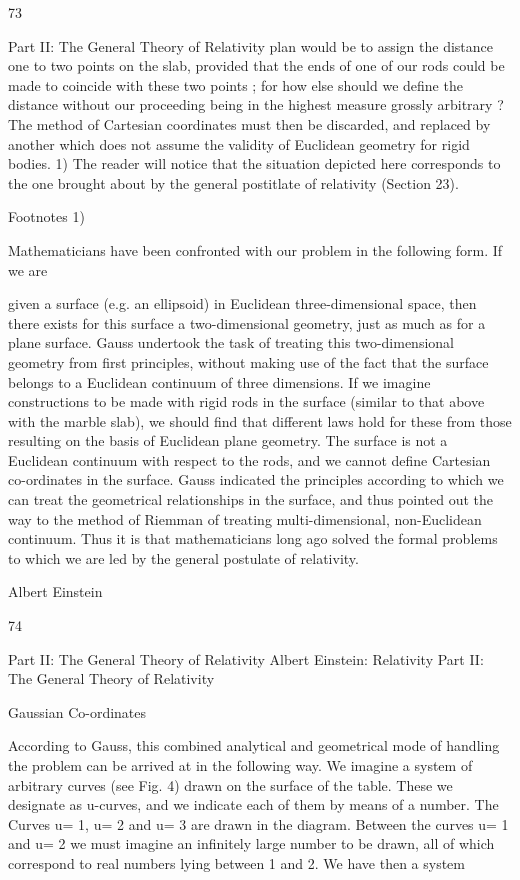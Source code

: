 \documentclass{article}
\begin{document}
73

Part II: The General Theory of Relativity
plan would be to assign the distance one to two points on the slab, provided that the ends of
one of our rods could be made to coincide with these two points ; for how else should we
define the distance without our proceeding being in the highest measure grossly arbitrary ?
The method of Cartesian coordinates must then be discarded, and replaced by another
which does not assume the validity of Euclidean geometry for rigid bodies. 1) The reader
will notice that the situation depicted here corresponds to the one brought about by the
general postitlate of relativity (Section 23).

Footnotes
1)

Mathematicians have been confronted with our problem in the following form. If we are

given a surface (e.g. an ellipsoid) in Euclidean three-dimensional space, then there exists for
this surface a two-dimensional geometry, just as much as for a plane surface. Gauss
undertook the task of treating this two-dimensional geometry from first principles, without
making use of the fact that the surface belongs to a Euclidean continuum of three
dimensions. If we imagine constructions to be made with rigid rods in the surface (similar
to that above with the marble slab), we should find that different laws hold for these from
those resulting on the basis of Euclidean plane geometry. The surface is not a Euclidean
continuum with respect to the rods, and we cannot define Cartesian co-ordinates in the
surface. Gauss indicated the principles according to which we can treat the geometrical
relationships in the surface, and thus pointed out the way to the method of Riemman of
treating multi-dimensional, non-Euclidean continuum. Thus it is that mathematicians long
ago solved the formal problems to which we are led by the general postulate of relativity.

Albert Einstein

74

Part II: The General Theory of Relativity
Albert Einstein: Relativity
Part II: The General Theory of Relativity

Gaussian Co-ordinates

According to Gauss, this combined analytical and geometrical mode of handling the
problem can be arrived at in the following way. We imagine a system of arbitrary curves
(see Fig. 4) drawn on the surface of the table. These we designate as u-curves, and we
indicate each of them by means of a number. The Curves u= 1, u= 2 and u= 3 are drawn in
the diagram. Between the curves u= 1 and u= 2 we must imagine an infinitely large number
to be drawn, all of which correspond to real numbers lying between 1 and 2. We have then a
system
\end{document}
